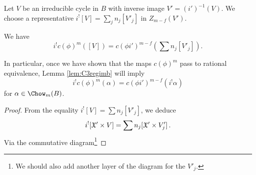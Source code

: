 Let $V$ be an irreducible cycle in $B$ with inverse image $V' = (i')^{-1}(V)$.
We choose a representative $i^![V] = \sum_j n_j [V'_j]$ in $Z_{m-f}(V')$.
\begin{lemma}
\notready\label{lem:C3regimb}
We have
\[i^! c(\phi)^m ([V]) = c(\phi i')^{m-f}\left(\sum n_j [V'_j]\right). \]
\end{lemma}
\begin{remark}
\notready
In particular, once we have shown that the maps $c(\phi)^m$ pass to rational equivalence,
Lemma \ref{lem:C3regimb} will imply
\[i^! c(\phi)^m(\alpha) = c(\phi i')^{m-f}(i^! \alpha) \]
for  $\alpha \in \Chow_m(B)$.
\end{remark}
\begin{proof}
From the equality $i^! [V] = \sum n_j [V'_j]$, we deduce
$$i^![\frak X' \times V] = \sum n_j [\frak X' \times V'_j]\, .$$
Via the commutative diagram\footnote{We should also add another layer of the diagram for the $V'_j$.
}




\end{proof}
